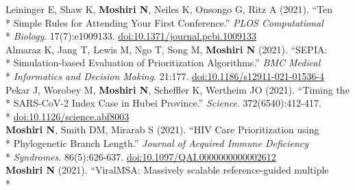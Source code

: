 \documentclass[margin,line]{res}
\begin{document}
\begin{resume}
\hspace*{4mm} Leininger E, Shaw K, \textbf{Moshiri N}, Neiles K, Onsongo G, Ritz A (2021). ``Ten\\*
\hspace*{9mm} Simple Rules for Attending Your First Conference.'' \textit{PLOS Computational}\\*\vspace{2mm}
\hspace*{8mm} \textit{Biology}. 17(7):e1009133. \href{https://doi.org/10.1371/journal.pcbi.1009133}{doi:10.1371/journal.pcbi.1009133}\\
\hspace*{4mm} Almaraz K, Jang T, Lewis M, Ngo T, Song M, \textbf{Moshiri N} (2021). ``SEPIA:\\*
\hspace*{9mm} Simulation-based Evaluation of Prioritization Algorithms.'' \textit{BMC Medical}\\*\vspace{2mm}
\hspace*{8mm} \textit{Informatics and Decision Making}. 21:177. \href{https://doi.org/10.1186/s12911-021-01536-4}{doi:10.1186/s12911-021-01536-4}\\
\hspace*{4mm} Pekar J, Worobey M, \textbf{Moshiri N}, Scheffler K, Wertheim JO (2021). ``Timing the\\*
\hspace*{9mm} SARS-CoV-2 Index Case in Hubei Province.'' \textit{Science}. 372(6540):412-417.\\*\vspace{2mm}
\hspace*{8mm} \href{https://doi.org/10.1126/science.abf8003}{doi:10.1126/science.abf8003}\\
\hspace*{4mm} \textbf{Moshiri N}, Smith DM, Mirarab S (2021). ``HIV Care Prioritization using\\*
\hspace*{9mm} Phylogenetic Branch Length.'' \textit{Journal of Acquired Immune Deficiency}\\*\vspace{2mm}
\hspace*{8mm} \textit{Syndromes}. 86(5):626-637. \href{https://doi.org/10.1097/QAI.0000000000002612}{doi:10.1097/QAI.0000000000002612}\\
\hspace*{4mm} \textbf{Moshiri N} (2021). ``ViralMSA: Massively scalable reference-guided multiple\\*

\end{resume}
\end{document}
